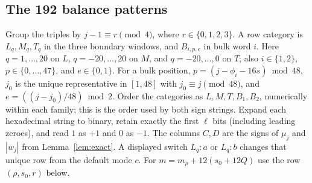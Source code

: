 \subsection{The 192 balance patterns}\label{sec:c4-balance-data}
Group the triples by $j-1\equiv r\pmod4$, where $r\in\{0,1,2,3\}$.
A row category is $L_q,M_q,T_q$ in the three boundary windows, and
$B_{i,p,e}$ in bulk word $i$.  Here
$q=1,\ldots,20$ on $L$, $q=-20,\ldots,20$ on $M$, and
$q=-20,\ldots,0$ on $T$; also $i\in\{1,2\}$,
$p\in\{0,\ldots,47\}$, and $e\in\{0,1\}$.  For a bulk position,
$p=(j-\phi_i-16s)\bmod48$, $j_0$ is the unique representative in $[1,48]$
with $j_0\equiv j\pmod{48}$, and
$e=((j-j_0)/48)\bmod2$.  Order the categories as
$L,M,T,B_1,B_2$, numerically within each family; this is the order used by both
sign strings.  Expand each hexadecimal string to binary, retain exactly the first
$\ell$ bits (including leading zeroes), and read $1$ as $+1$ and $0$ as $-1$.
The columns $C,D$ are the signs of $\mu_j$ and $|w_j|$ from
Lemma~\ref{lem:exact}.  A displayed switch $L_q:a$ or $L_q:b$ changes that unique
row from the default mode $c$.  For
$m=m_\rho+12(s_0+12Q)$ use the row $(\rho,s_0,r)$ below.
\begingroup\scriptsize
\setlength{\LTleft}{0pt}\setlength{\LTright}{0pt}
